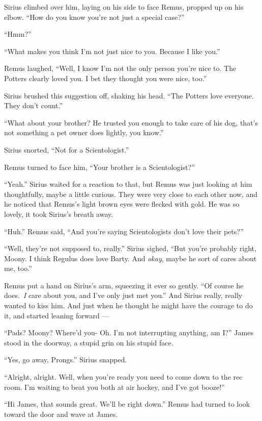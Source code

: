\documentclass[12pt,twoside,openright]{memoir}
\begin{document}
Sirius climbed over him, laying on his side to face Remus, propped up on his elbow. ``How do you know you're not just a special case?''

``Hmm?''

``What makes you think I'm not just nice to you. Because I like you.''

Remus laughed, ``Well, I know I'm not the only person you're nice to. The Potters clearly loved you. I bet they thought you were nice, too.''

Sirius brushed this suggestion off, shaking his head. ``The Potters love everyone. They don't count.''

``What about your brother? He trusted you enough to take care of his dog, that's not something a pet owner does lightly, you know.''

Sirius snorted, ``Not for a Scientologist.''

Remus turned to face him, ``Your brother is a Scientologist?''

``Yeah.'' Sirius waited for a reaction to that, but Remus was just looking at him thoughtfully, maybe a little curious. They were very close to each other now, and he noticed that Remus's light brown eyes were flecked with gold. He was so lovely, it took Sirius's breath away.

``Huh.'' Remus said, ``And you're saying Scientologists don't love their pets?''

``Well, they're not supposed to, really.'' Sirius sighed, ``But you're probably right, Moony. I think Regulus does love Barty. And \textit{okay}, maybe he sort of cares about me, too.''

Remus put a hand on Sirius's arm, squeezing it ever so gently. ``Of course he does.\ \textit{I} care about you, and I've only just met you.'' And Sirius really, really wanted to kiss him. And just when he thought he might have the courage to do it, and started leaning forward ---

``Pads? Moony? Where'd you- Oh. I'm not interrupting anything, am I?'' James stood in the doorway, a stupid grin on his stupid face.

``Yes, go away, Prongs.'' Sirius snapped.

``Alright, alright. Well, when you're ready you need to come down to the rec room. I'm waiting to beat you both at air hockey, and I've got booze!''

``Hi James, that sounds great. We'll be right down.'' Remus had turned to look toward the door and wave at James.
\end{document}
